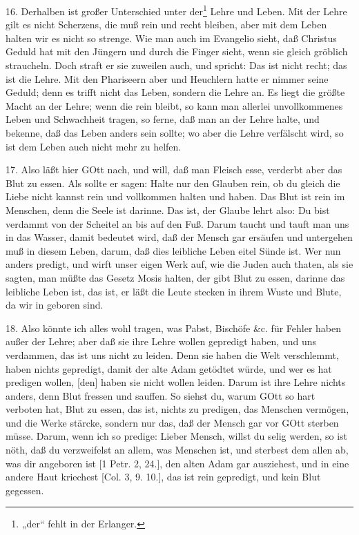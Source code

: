16. Derhalben ist großer Unterschied unter der\footnote{„der“ fehlt in der Erlanger.} Lehre und Leben. Mit der Lehre gilt es nicht Scherzens, die muß rein und recht bleiben, aber mit dem Leben halten wir es nicht so strenge. Wie man auch im Evangelio sieht, daß Christus Geduld hat mit den Jüngern und durch die Finger sieht, wenn sie gleich gröblich straucheln. Doch straft er sie zuweilen auch, und spricht: Das ist nicht recht; das ist die Lehre. Mit den Phariseern aber und Heuchlern
hatte er nimmer seine Geduld; denn es trifft nicht das Leben, sondern die Lehre an. Es liegt die größte Macht an der Lehre; wenn die rein bleibt, so kann man allerlei unvollkommenes Leben und Schwachheit tragen, so ferne, daß man an der Lehre halte, und bekenne, daß das Leben anders sein sollte; wo aber die Lehre verfälscht wird, so ist dem Leben auch nicht mehr zu helfen.

17. Also läßt hier GOtt nach, und will, daß man Fleisch esse, verderbt aber das Blut zu essen. Als sollte er sagen: Halte nur den Glauben rein, ob du gleich die Liebe nicht kannst rein und vollkommen halten und haben. Das Blut ist rein im Menschen, denn die Seele ist darinne. Das ist, der Glaube lehrt also: Du bist verdammt von der Scheitel an bis auf den Fuß. Darum taucht und tauft man uns in das Wasser, damit bedeutet wird, daß der Mensch gar ersäufen und untergehen muß in diesem Leben, darum, daß dies leibliche Leben eitel Sünde ist. Wer nun anders predigt, und wirft unser eigen Werk auf, wie die Juden auch thaten, als sie sagten, man müßte das Gesetz Mosis halten, der gibt Blut zu essen, darinne das leibliche Leben ist, das ist, er läßt die Leute stecken in ihrem Wuste und Blute, da wir in geboren sind.

18. Also könnte ich alles wohl tragen, was Pabst, Bischöfe \&c. für Fehler haben außer der Lehre; aber daß sie ihre Lehre wollen gepredigt haben, und uns verdammen, das ist uns nicht zu leiden. Denn sie haben die Welt verschlemmt, haben nichts gepredigt, damit der alte Adam getödtet würde, und wer es hat predigen wollen, [den] haben sie nicht wollen leiden. Darum ist ihre Lehre nichts anders, denn Blut fressen und sauffen. So siehst du, warum GOtt so hart verboten hat, Blut zu essen, das ist, nichts zu predigen, das Menschen vermögen, und die Werke stärcke, sondern nur das, daß der Mensch gar vor GOtt sterben müsse. Darum, wenn ich so predige: Lieber Mensch, willst du selig werden, so ist nöth, daß du verzweifelst an allem, was Menschen ist, und sterbest dem allen ab, was dir angeboren ist [1 Petr. 2, 24.], den alten Adam gar ausziehest, und in eine andere Haut kriechest [Col. 3, 9. 10.], das ist rein gepredigt, und kein Blut gegessen.


